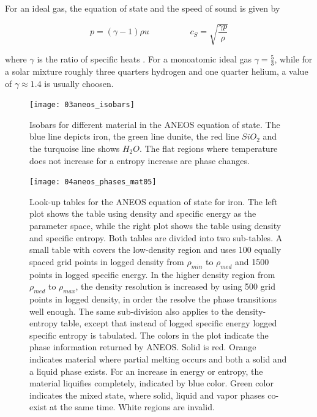 For an ideal gas, the equation of state and the speed of sound is given by

\begin{equation}
\label{ch02_sph01_eq036}
p = ( \gamma - 1 ) \rho u \hspace{2cm} c_S = \sqrt{ \frac{\gamma p}{\rho} }
\end{equation}

where $\gamma$ is the ratio of specific heats . For a monoatomic ideal gas $\gamma = \frac{5}{3}$, while for a solar mixture roughly three quarters hydrogen and one quarter helium, a value of $\gamma \approx 1.4$ is usually choosen. 

\begin{figure}
\begin{center}
\texttt{[image: 03aneos\_isobars]}
\caption{Isobars for different material in the ANEOS equation of state. The blue line depicts iron, the green line dunite, the red line $SiO_2$ and the turquoise line shows $H_2 O$. The flat regions where temperature does not increase for a entropy increase are phase changes. }
\label{ch02_eos02_fig01}
\end{center}
\end{figure}

\begin{figure}
\begin{center}
\texttt{[image: 04aneos\_phases\_mat05]}
\caption{Look-up tables for the ANEOS equation of state for iron. The left plot shows the table using density and specific energy as the parameter space, while the right plot shows the table using density and specific entropy. Both tables are divided into two sub-tables. A small table with covers the low-density region and uses 100 equally spaced grid points in logged density from $\rho_{min}$ to $\rho_{med}$ and 1500 points in logged specific energy. In the higher density region from $\rho_{med}$ to $\rho_{max}$, the density resolution is increased by using 500 grid points in logged density, in order the resolve the phase transitions well enough. The same sub-division also applies to the density-entropy table, except that instead of logged specific energy logged specific entropy is tabulated. The colors in the plot indicate the phase information returned by ANEOS. Solid is red. Orange indicates material where partial melting occurs and both a solid and a liquid phase exists. For an increase in energy or entropy, the material liquifies completely, indicated by blue color. Green color indicates the mixed state, where solid, liquid and vapor phases co-exist at the same time. White regions are invalid.}
\label{ch02_eos02_fig02}
\end{center}
\end{figure}


